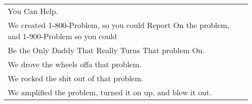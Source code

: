 \begin{center}
\begin{tabular}{l}
\hspace{0.3cm} You Can Help.\\
We created 1-800-Problem, so you could Report On the problem, and 1-900-Problem so you could\\
\hspace{0.3cm} Be the Only Daddy That Really Turns That problem On.\\
We drove the wheels offa that problem.\\
We rocked the shit out of that problem.\\
We amplified the problem, turned it on up, and blew it out.
\end{tabular}
\end{center}
\vfill
\hspace{0pt}